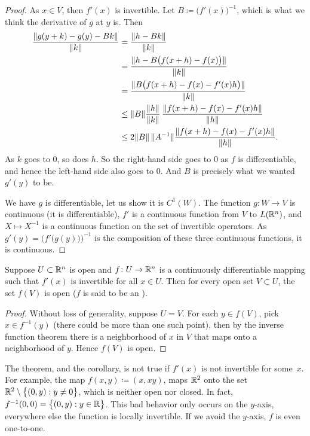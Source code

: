 \begin{proof}
As $x \in V$, then $f'(x)$ is invertible.
Let $B \coloneqq \bigl(f'(x)\bigr)^{-1}$, which is what we think the derivative of
$g$ at $y$ is.  Then
\begin{equation*}
\begin{split}
\frac{\lVert {g(y+k)-g(y)-Bk} \rVert}{\lVert {k} \rVert}
& =
\frac{\lVert {h-Bk} \rVert}{\lVert {k} \rVert}
\\
& =
\frac{\lVert {h-B\bigl(f(x+h)-f(x)\bigr)} \rVert}{\lVert {k} \rVert}
\\
& =
\frac{\lVert {B\bigl(f(x+h)-f(x)-f'(x)h\bigr)} \rVert}{\lVert {k} \rVert}
\\
& \leq
\lVert {B} \rVert
\frac{\lVert {h} \rVert}{\lVert {k} \rVert}\,
\frac{\lVert {f(x+h)-f(x)-f'(x)h} \rVert}{\lVert {h} \rVert}
\\
& \leq
2\lVert {B} \rVert \, \lVert {A^{-1}} \rVert
\frac{\lVert {f(x+h)-f(x)-f'(x)h} \rVert}{\lVert {h} \rVert} .
\end{split}
\end{equation*}
As $k$ goes to 0, so does $h$.  So the right-hand side goes to 0 as $f$ is
differentiable, and hence
the left-hand side also goes to 0.  And
$B$ is precisely what we wanted $g'(y)$ to be.

We have $g$ is differentiable, let us show it is $C^1(W)$.
The function $g \colon W \to V$ is continuous (it is differentiable),
$f'$ is a continuous function from $V$
to $L({\mathbb{R}}^n)$, and $X \mapsto X^{-1}$ is a continuous function on
the set of invertible operators.
As
$g'(y) = {\bigl( f'\bigl(g(y)\bigr)\bigr)}^{-1}$ is the composition
of these three
continuous functions, it is continuous.
\end{proof}

\begin{cor} \label{cor:IVTopenmap}
Suppose $U \subset {\mathbb{R}}^n$ is open and $f \colon U \to {\mathbb{R}}^n$ is a continuously
differentiable mapping such that $f'(x)$ is invertible for all $x \in U$.  Then
for every open set $V \subset U$, the set $f(V)$ is open ($f$ is said to be an
\emph{}).
\end{cor}

\begin{proof}
Without loss of generality, suppose $U=V$.
For each $y \in f(V)$, pick $x \in f^{-1}(y)$ (there could be more
than one such point), then by the inverse function theorem there is a
neighborhood of $x$ in $V$ that maps onto a neighborhood of $y$.  Hence
$f(V)$ is open.
\end{proof}

\begin{example}
The theorem, and the corollary, is not true if $f'(x)$ is not invertible for
some~$x$.  For example,
the map $f(x,y) \coloneqq (x,xy)$, maps ${\mathbb{R}}^2$ onto the set
${\mathbb{R}}^2 \setminus \bigl\{ (0,y) : y \neq 0 \bigr\}$, which is neither open nor closed.
In fact, $f^{-1}(0,0) = \bigl\{ (0,y) : y \in {\mathbb{R}} \bigr\}$.  This bad behavior
only occurs on the $y$-axis, everywhere else the function is locally
invertible.  If we avoid the $y$-axis, $f$ is even one-to-one.
\end{example}


